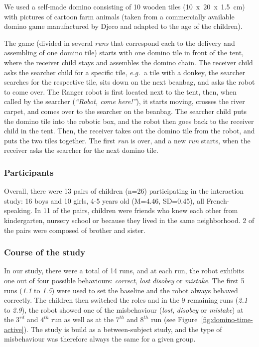 \documentclass{sig-alternate}
\newcommand{\eg}{{\textit{e.g.~}}}
\begin{document}
We used a self-made domino consisting of 10 wooden tiles (10~x~20~x~1.5~cm) with
pictures of cartoon farm animals (taken from a commercially available domino
game manufactured by Djeco and adapted to the age of the children).

The game (divided in several \emph{runs} that correspond each to the delivery
and assembling of one domino tile) starts with one domino tile in front of the
tent, where the receiver child stays and assembles the domino chain. The
receiver child asks the searcher child for a specific tile, \eg a tile with a
donkey, the searcher searches for the respective tile, sits down on the next
beanbag, and asks the robot to come over.  The Ranger robot is first located
next to the tent, then, when called by the searcher (\textit{``Robot, come
here!''}), it starts moving, crosses the river carpet, and comes over to the
searcher on the beanbag. The searcher child puts the domino tile into the
robotic box, and the robot then goes back to the receiver child in the tent.
Then, the receiver takes out the domino tile from the robot, and puts the two
tiles together. The first \emph{run} is over, and a new \emph{run} starts, when
the receiver asks the searcher for the next domino tile.

\subsubsection{Participants}

Overall, there were 13 pairs of children (n=26) participating in the interaction
study: 16 boys and 10 girls, 4-5 years old (M=4.46, SD=0.45), all
French-speaking. In 11 of the pairs, children were friends who knew each other
from kindergarten, nursery school or because they lived in the same
neighborhood. 2 of the pairs were composed of brother and sister.


\subsubsection{Course of the study}

In our study, there were a total of 14 runs, and at each run, the robot exhibits
one out of four possible behaviours: \emph{correct}, \emph{lost}
\emph{disobey} or \emph{mistake}.  The first 5 runs (\emph{1.1} to \emph{1.5}) were used to set
the baseline and the robot always behaved correctly. The children then switched
the roles and in the 9 remaining runs (\emph{2.1} to \emph{2.9}), the robot
showed one of the misbehaviour (\emph{lost}, \emph{disobey} or \emph{mistake})
at the $3^{rd}$ and $4^{th}$ run as well as at the $7^{th}$ and $8^{th}$ run
(see Figure~\ref{fig:domino-time-active}). The study is build as a
between-subject study, and the type of misbehaviour was therefore always the
same for a given group.
\end{document}
